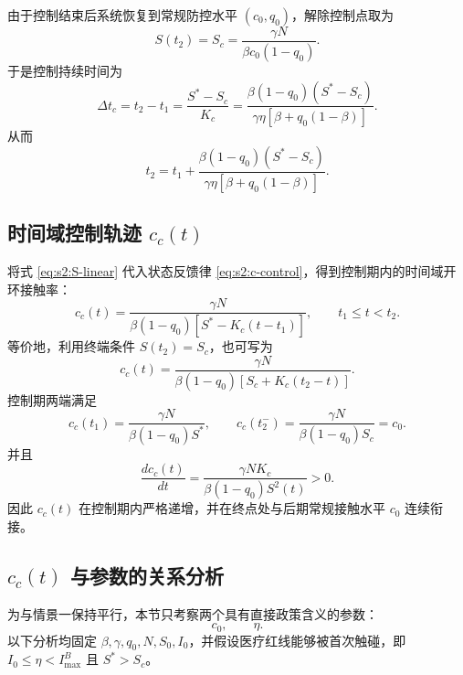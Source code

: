 由于控制结束后系统恢复到常规防控水平 $(c_0,q_0)$，解除控制点取为
\begin{equation}
S(t_2)=S_c=\frac{\gamma N}{\beta c_0(1-q_0)}.
\end{equation}
于是控制持续时间为
\begin{equation}
\Delta t_c
=
t_2-t_1
=
\frac{S^*-S_c}{K_c}
=
\frac{\beta(1-q_0)(S^*-S_c)}
{\gamma\eta[\beta+q_0(1-\beta)]}.
\label{eq:s2:delta-t}
\end{equation}
从而
\begin{equation}
t_2
=
t_1+
\frac{\beta(1-q_0)(S^*-S_c)}
{\gamma\eta[\beta+q_0(1-\beta)]}.
\label{eq:s2:t2}
\end{equation}

\subsection{时间域控制轨迹 $c_c(t)$}

将式 \eqref{eq:s2:S-linear} 代入状态反馈律 \eqref{eq:s2:c-control}，得到控制期内的时间域开环接触率：
\begin{equation}
c_c(t)
=
\frac{\gamma N}
{\beta(1-q_0)\left[S^*-K_c(t-t_1)\right]},
\qquad
t_1\leq t<t_2.
\label{eq:s2:c-time}
\end{equation}
等价地，利用终端条件 $S(t_2)=S_c$，也可写为
\begin{equation}
c_c(t)
=
\frac{\gamma N}
{\beta(1-q_0)\left[S_c+K_c(t_2-t)\right]}.
\label{eq:s2:c-time-remaining}
\end{equation}
控制期两端满足
\begin{equation}
c_c(t_1)
=
\frac{\gamma N}{\beta(1-q_0)S^*},
\qquad
c_c(t_2^-)
=
\frac{\gamma N}{\beta(1-q_0)S_c}
=c_0.
\label{eq:s2:c-endpoints}
\end{equation}
并且
\begin{equation}
\frac{dc_c(t)}{dt}
=
\frac{\gamma N K_c}
{\beta(1-q_0)S^2(t)}>0.
\end{equation}
因此 $c_c(t)$ 在控制期内严格递增，并在终点处与后期常规接触水平 $c_0$ 连续衔接。

\subsection{$c_c(t)$ 与参数的关系分析}

为与情景一保持平行，本节只考察两个具有直接政策含义的参数：
\[
c_0,\qquad \eta .
\]
以下分析均固定 $\beta,\gamma,q_0,N,S_0,I_0$，并假设医疗红线能够被首次触碰，即
$I_0\leq\eta<I_{\max}^{B}$ 且 $S^*>S_c$。

